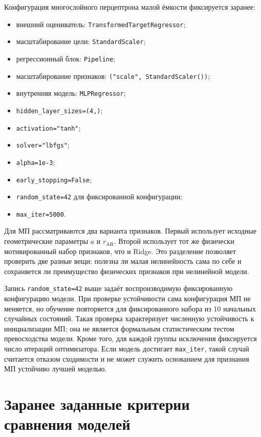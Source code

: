 Конфигурация многослойного перцептрона малой ёмкости фиксируется заранее:
\begin{itemize}
  \item внешний оцениватель: \texttt{TransformedTargetRegressor};
  \item масштабирование цели: \texttt{StandardScaler};
  \item регрессионный блок: \texttt{Pipeline};
  \item масштабирование признаков: \texttt{("scale", StandardScaler())};
  \item внутренняя модель: \texttt{MLPRegressor};
  \item \texttt{hidden\_layer\_sizes=(4,)};
  \item \texttt{activation="tanh"};
  \item \texttt{solver="lbfgs"};
  \item \texttt{alpha=1e-3};
  \item \texttt{early\_stopping=False};
  \item \texttt{random\_state=42} для фиксированной конфигурации;
  \item \texttt{max\_iter=5000}.
\end{itemize}

Для МП рассматриваются два варианта признаков. Первый использует исходные геометрические
параметры $a$ и $r_{\mathrm{AR}}$. Второй использует тот же физически мотивированный набор
признаков, что и Ridge. Это разделение позволяет проверить две разные вещи: полезна ли
малая нелинейность сама по себе и сохраняется ли преимущество физических признаков при
нелинейной модели.

Запись \texttt{random\_state=42} выше задаёт воспроизводимую фиксированную конфигурацию
модели. При проверке устойчивости сама конфигурация МП не меняется, но обучение
повторяется для фиксированного набора из 10 начальных случайных состояний. Такая проверка
характеризует численную устойчивость к инициализации МП; она не является формальным
статистическим тестом превосходства модели. Кроме того, для каждой группы исключения
фиксируется число итераций оптимизатора. Если модель достигает \texttt{max\_iter}, такой
случай считается отказом сходимости и не может служить основанием для признания МП
устойчиво лучшей моделью.

\section{Заранее заданные критерии сравнения моделей}

